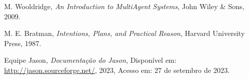 \documentclass[12pt]{article}
\begin{document}
\begin{thebibliography}{9}
M. Wooldridge,
\textit{An Introduction to MultiAgent Systems},
John Wiley \& Sons, 2009.

M. E. Bratman,
\textit{Intentions, Plans, and Practical Reason},
Harvard University Press, 1987.

Equipe Jason,
\textit{Documentação do Jason},
Disponível em: \url{http://jason.sourceforge.net/}, 2023, Acesso em: 27 de setembro de 2023.

\end{thebibliography}
\end{document}
